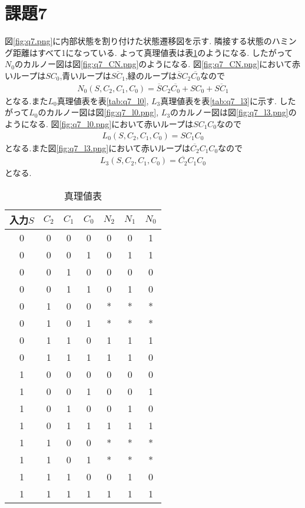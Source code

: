 \section{課題7}
図\ref{fig:q7.png}に内部状態を割り付けた状態遷移図を示す.
隣接する状態のハミング距離はすべて1になっている.
よって真理値表は表\ref{tab:q7_CN}のようになる.
したがって$N_0$のカルノー図は図\ref{fig:q7_CN.png}のようになる.
図\ref{fig:q7_CN.png}において赤いループは$SC_0$,青いループは$\overline{SC_1}$,緑のループは$\overline{S}C_2\overline{C_0}$なので
\begin{align*}
  N_0(S, C_2, C_1, C_0)=\overline{S}C_2\overline{C_0}+SC_0+\overline{SC_1}
\end{align*}
となる.また$L_0$真理値表を表\ref{tab:q7_l0}, $L_3$真理値表を表\ref{tab:q7_l3}に示す.
したがって$L_0$のカルノー図は図\ref{fig:q7_l0.png}, $L_3$のカルノー図は図\ref{fig:q7_l3.png}のようになる.
図\ref{fig:q7_l0.png}において赤いループは$SC_1C_0$なので
\begin{align*}
  L_0(S, C_2, C_1, C_0)=SC_1C_0
\end{align*}
となる.また図\ref{fig:q7_l3.png}において赤いループは$\overline{C_2}C_1C_0$なので
\begin{align*}
  L_3(S, C_2, C_1, C_0)=\overline{C_2}C_1C_0
\end{align*}
となる.
\begin{table}[h]
\caption{真理値表}
\label{tab:q7_CN}
\centering
\begin{tabular}{c|ccc|ccc}
\hline
入力$S$&$C_2$&$C_1$&$C_0$&$N_2$&$N_1$&$N_0$\\
\hline \hline
0 & 0 & 0 & 0 & 0 & 0 & 1 \\
0 & 0 & 0 & 1 & 0 & 1 & 1 \\
0 & 0 & 1 & 0 & 0 & 0 & 0 \\
0 & 0 & 1 & 1 & 0 & 1 & 0 \\
0 & 1 & 0 & 0 & * & * & * \\
0 & 1 & 0 & 1 & * & * & * \\
0 & 1 & 1 & 0 & 1 & 1 & 1 \\
0 & 1 & 1 & 1 & 1 & 1 & 0 \\
\hline
1 & 0 & 0 & 0 & 0 & 0 & 0 \\
1 & 0 & 0 & 1 & 0 & 0 & 1 \\
1 & 0 & 1 & 0 & 0 & 1 & 0 \\
1 & 0 & 1 & 1 & 1 & 1 & 1 \\
1 & 1 & 0 & 0 & * & * & * \\
1 & 1 & 0 & 1 & * & * & * \\
1 & 1 & 1 & 0 & 0 & 1 & 0 \\
1 & 1 & 1 & 1 & 1 & 1 & 1 \\
\hline
\end{tabular}
\end{table}
